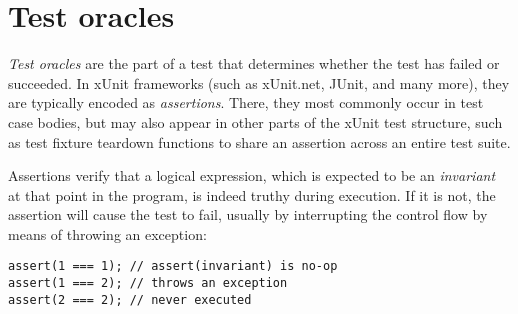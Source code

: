 \section{Test oracles}
\textit{Test oracles} are the part of a test
that determines whether the test
has failed or succeeded.
\autocite{HowdenTesting}
In xUnit frameworks (such as xUnit.net, JUnit, and many more),
they are typically encoded as \textit{assertions}.
\autocite{MeszarosXUnit}
There, they most commonly occur in test case bodies,
but may also appear in other parts of the xUnit test structure,
such as test fixture teardown functions
to share an assertion across an entire test suite.

Assertions verify that a logical expression,
which is expected to be an \textit{invariant}
at that point in the program,
is indeed truthy during execution.
If it is not,
the assertion will cause the test to fail,
usually by interrupting the control flow
by means of throwing an exception:
\begin{verbatim}
assert(1 === 1); // assert(invariant) is no-op
assert(1 === 2); // throws an exception
assert(2 === 2); // never executed
\end{verbatim}
